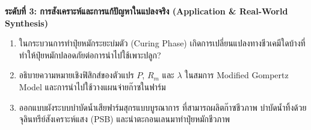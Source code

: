 \noindent \textbf{ระดับที่ 3: การสังเคราะห์และการแก้ปัญหาในแปลงจริง (Application \& Real-World Synthesis)}
\begin{enumerate}[resume]
    \item ในกระบวนการทำปุ๋ยหมักระยะบ่มตัว (Curing Phase) เกิดการเปลี่ยนแปลงทางชีวเคมีใดบ้างที่ทำให้ปุ๋ยหมักปลอดภัยต่อการนำไปใช้เพาะปลูก?
    \item อธิบายความหมายเชิงฟิสิกส์ของตัวแปร $P$, $R_m$ และ $\lambda$ ในสมการ Modified Gompertz Model และการนำไปใช้วางแผนจ่ายก๊าซในฟาร์ม
    \item ออกแบบผังระบบบำบัดน้ำเสียฟาร์มสุกรแบบบูรณาการ ที่สามารถผลิตก๊าซชีวภาพ บำบัดน้ำทิ้งด้วยจุลินทรีย์สังเคราะห์แสง (PSB) และนำตะกอนเลนมาทำปุ๋ยหมักชีวภาพ
\end{enumerate}
